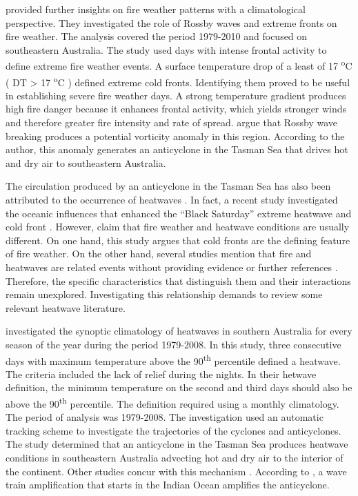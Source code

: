 \citet{Reeder2015} provided further insights on fire weather patterns
with a climatological perspective. They investigated the role of Rossby
waves and extreme fronts on fire weather. The analysis covered the
period 1979-2010 and focused on southeastern Australia. The study
used days with intense frontal activity to define extreme fire weather
events. A surface temperature drop of a least of 17 \textsuperscript{o}C
( \textgreek{D}T > 17 \textsuperscript{o}C ) defined extreme cold
fronts. Identifying them proved to be useful in establishing severe fire
weather days. A strong temperature gradient produces high fire danger 
because it enhances frontal activity, which yields stronger winds 
and therefore greater fire intensity and rate of spread. \citet{Reeder2015} argue that Rossby wave breaking
produces a potential vorticity anomaly in this region. According to
the author, this anomaly generates an anticyclone in the Tasman Sea
that drives hot and dry air to southeastern Australia. 

The circulation produced by an anticyclone in the Tasman Sea has also
been attributed to the occurrence of heatwaves \citep{Pezza2012,Parker2013,Boschat2014}.
In fact, a recent study investigated the oceanic influences that enhanced
the ``Black Saturday'' extreme heatwave and cold front \citep{Fiddes2015}.
However, \citet{Reeder2015} claim that fire weather and heatwave
conditions are usually different. On one hand, this study argues that
cold fronts are the defining feature of fire weather. On the other
hand, several studies mention that fire and heatwaves are related
events without providing evidence or further references \citep{Pezza2012,Parker2013,Boschat2014}.
Therefore, the specific characteristics that distinguish them and
their interactions remain unexplored. Investigating this relationship
demands to review some relevant heatwave literature.

\citet{Pezza2012} investigated the synoptic climatology of heatwaves
in southern Australia for every season of the year during the period 1979-2008. 
In this study, three consecutive days with
maximum temperature above the 90\textsuperscript{th} percentile defined
a heatwave. The criteria included the lack of relief during the nights.
In their hetwave definition, the minimum temperature on the second
and third days should also be above the 90\textsuperscript{th} percentile.
The definition required using a monthly climatology. The period of
analysis was 1979-2008. The investigation used an automatic tracking
scheme \citep{Murray1999} to investigate the trajectories of the
cyclones and anticyclones. The study determined that an anticyclone
in the Tasman Sea produces heatwave conditions in southeastern Australia
advecting hot and dry air to the interior of the continent. Other
studies concur with this mechanism \citep{Parker2013,Parker2014a}.
According to \citet{Pezza2012}, a wave train amplification that starts
in the Indian Ocean amplifies the anticyclone. 

